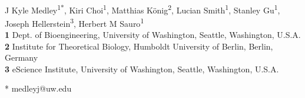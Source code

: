 \documentclass[10pt,letterpaper]{article}
\date{}
\begin{document}
\vspace*{0.2in}

\begin{flushleft}
{\Large
\textbf{} %
}
\newline
\\
J Kyle Medley\textsuperscript{1*},
Kiri Choi\textsuperscript{1},
Matthias K\"{o}nig\textsuperscript{2},
Lucian Smith\textsuperscript{1},
Stanley Gu\textsuperscript{1},
Joseph Hellerstein\textsuperscript{3},
Herbert M Sauro\textsuperscript{1}
\\
\bigskip
\textbf{1} Dept. of Bioengineering, University of Washington, Seattle, Washington, U.S.A.
\\
\textbf{2} Institute for Theoretical Biology, Humboldt University of Berlin, Berlin, Germany
\\
\textbf{3} eScience Institute, University of Washington, Seattle, Washington, U.S.A.
\\
\bigskip

%



%
%




* medleyj@uw.edu

\end{flushleft}
%
%
\end{document}
